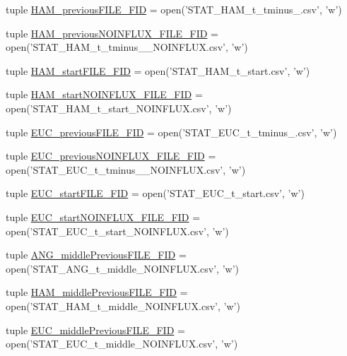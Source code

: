 \begin{DoxyCompactItemize}
\item 
tuple \hyperlink{a00099_a3aad86d2cdbfb6f36b4b563b190d76c9}{H\-A\-M\-\_\-previous\-F\-I\-L\-E\-\_\-\-F\-I\-D} = open('S\-T\-A\-T\-\_\-\-H\-A\-M\-\_\-t\-\_\-tminus\-\_.\-csv', 'w')
\item 
tuple \hyperlink{a00099_a621d86851e86f9c83bb0add9ec741d7f}{H\-A\-M\-\_\-previous\-N\-O\-I\-N\-F\-L\-U\-X\-\_\-\-F\-I\-L\-E\-\_\-\-F\-I\-D} = open('S\-T\-A\-T\-\_\-\-H\-A\-M\-\_\-t\-\_\-tminus\-\_\-\_\-\-N\-O\-I\-N\-F\-L\-U\-X.\-csv', 'w')
\item 
tuple \hyperlink{a00099_abb14887e587e1107fc13046ad313077e}{H\-A\-M\-\_\-start\-F\-I\-L\-E\-\_\-\-F\-I\-D} = open('S\-T\-A\-T\-\_\-\-H\-A\-M\-\_\-t\-\_\-start.\-csv', 'w')
\item 
tuple \hyperlink{a00099_ab8a3b402c0b418cc290889a5f6482280}{H\-A\-M\-\_\-start\-N\-O\-I\-N\-F\-L\-U\-X\-\_\-\-F\-I\-L\-E\-\_\-\-F\-I\-D} = open('S\-T\-A\-T\-\_\-\-H\-A\-M\-\_\-t\-\_\-start\-\_\-\-N\-O\-I\-N\-F\-L\-U\-X.\-csv', 'w')
\item 
tuple \hyperlink{a00099_a3548edac9afffda077dcbd2876616b39}{E\-U\-C\-\_\-previous\-F\-I\-L\-E\-\_\-\-F\-I\-D} = open('S\-T\-A\-T\-\_\-\-E\-U\-C\-\_\-t\-\_\-tminus\-\_.\-csv', 'w')
\item 
tuple \hyperlink{a00099_aa2efc59329473a7bbeaf3ce32ec4dc3d}{E\-U\-C\-\_\-previous\-N\-O\-I\-N\-F\-L\-U\-X\-\_\-\-F\-I\-L\-E\-\_\-\-F\-I\-D} = open('S\-T\-A\-T\-\_\-\-E\-U\-C\-\_\-t\-\_\-tminus\-\_\-\_\-\-N\-O\-I\-N\-F\-L\-U\-X.\-csv', 'w')
\item 
tuple \hyperlink{a00099_a3d812ff298612e6aae54e7a9abfddbf2}{E\-U\-C\-\_\-start\-F\-I\-L\-E\-\_\-\-F\-I\-D} = open('S\-T\-A\-T\-\_\-\-E\-U\-C\-\_\-t\-\_\-start.\-csv', 'w')
\item 
tuple \hyperlink{a00099_a8ae5873fd9b162495a512e314047e930}{E\-U\-C\-\_\-start\-N\-O\-I\-N\-F\-L\-U\-X\-\_\-\-F\-I\-L\-E\-\_\-\-F\-I\-D} = open('S\-T\-A\-T\-\_\-\-E\-U\-C\-\_\-t\-\_\-start\-\_\-\-N\-O\-I\-N\-F\-L\-U\-X.\-csv', 'w')
\item 
tuple \hyperlink{a00099_aa5eb16eef2c90e2ccc991eb176280f21}{A\-N\-G\-\_\-middle\-Previous\-F\-I\-L\-E\-\_\-\-F\-I\-D} = open('S\-T\-A\-T\-\_\-\-A\-N\-G\-\_\-t\-\_\-middle\-\_\-\-N\-O\-I\-N\-F\-L\-U\-X.\-csv', 'w')
\item 
tuple \hyperlink{a00099_aaf0dd6e74d88a7cf2e909301b422c17d}{H\-A\-M\-\_\-middle\-Previous\-F\-I\-L\-E\-\_\-\-F\-I\-D} = open('S\-T\-A\-T\-\_\-\-H\-A\-M\-\_\-t\-\_\-middle\-\_\-\-N\-O\-I\-N\-F\-L\-U\-X.\-csv', 'w')
\item 
tuple \hyperlink{a00099_afcb9ec3ed11cfcacae8f796af7605425}{E\-U\-C\-\_\-middle\-Previous\-F\-I\-L\-E\-\_\-\-F\-I\-D} = open('S\-T\-A\-T\-\_\-\-E\-U\-C\-\_\-t\-\_\-middle\-\_\-\-N\-O\-I\-N\-F\-L\-U\-X.\-csv', 'w')

\end{DoxyCompactItemize}
